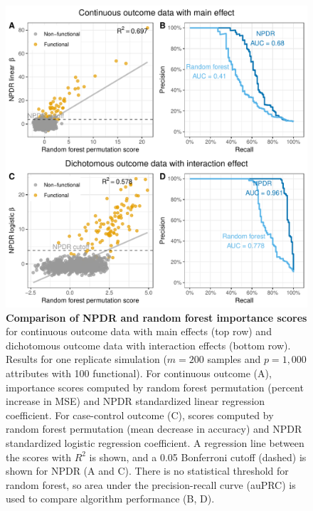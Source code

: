 \documentclass{article}
\begin{document}
\begin{figure}[h]%
\centerline{\includegraphics[]{../figs/npdr_rf.pdf}}
\caption{\textbf{Comparison of NPDR and random forest importance scores} for continuous outcome data with main effects (top row) and dichotomous outcome data with interaction effects (bottom row). Results for one replicate simulation ($m = 200$ samples and $p = 1,000$ attributes with 100 functional). For continuous outcome (A), importance scores computed by random forest permutation (percent increase in MSE) and NPDR standardized linear regression coefficient. For case-control outcome (C), scores computed by random forest permutation (mean decrease in accuracy) and NPDR standardized logistic regression coefficient. A regression line between the scores with $R^2$ is shown, and a 0.05 Bonferroni cutoff (dashed) is shown for NPDR (A and C). There is no statistical threshold for random forest, so area under the precision-recall curve (auPRC) is used to compare algorithm performance (B, D).}
\label{fig:auPRC}
\end{figure}
\end{document}
